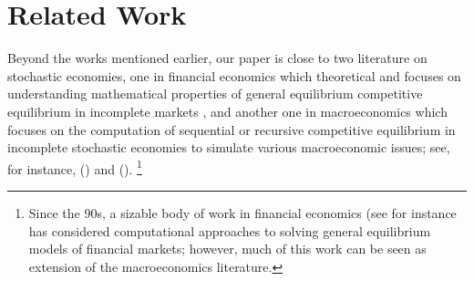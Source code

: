 \section{Related Work}
\label{sec:related}

Beyond the works mentioned earlier, our paper is close to two literature on stochastic economies, one in financial economics which theoretical and focuses on understanding mathematical properties of general equilibrium competitive equilibrium in incomplete markets \cite{duffie1987stochastic, duffie1990stochmodels, duffie1985equilibrium,duffie1986equilibrium}, and another one in macroeconomics which focuses on the computation of sequential or recursive competitive equilibrium in incomplete stochastic economies to simulate various macroeconomic issues; see, for instance, \citeauthor{kydland1982time} (\citeyear{kydland1982time}) and \citeauthor{lucas1971investment} (\citeyear{lucas1971investment}).%
\footnote{Since the 90s, a sizable body of work in financial economics (see for instance \cite{fernandez1016solve, auclert2021using} has considered computational approaches to solving general equilibrium models of financial markets; however, much of this work can be seen as extension of the macroeconomics literature.} 

